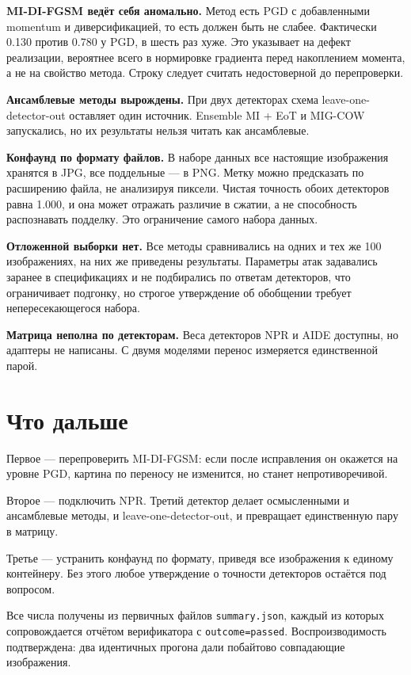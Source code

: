 \documentclass[11pt,a4paper]{article}
\begin{document}
\textbf{MI-DI-FGSM ведёт себя аномально.} Метод есть PGD с добавленными
momentum и диверсификацией, то есть должен быть не слабее. Фактически 0.130
против 0.780 у PGD, в шесть раз хуже. Это указывает на дефект реализации,
вероятнее всего в нормировке градиента перед накоплением момента, а не на
свойство метода. Строку следует считать недостоверной до перепроверки.

\textbf{Ансамблевые методы вырождены.} При двух детекторах схема
leave-one-detector-out оставляет один источник. Ensemble MI + EoT и MIG-COW
запускались, но их результаты нельзя читать как ансамблевые.

\textbf{Конфаунд по формату файлов.} В наборе данных все настоящие изображения
хранятся в JPG, все поддельные — в PNG. Метку можно предсказать по расширению
файла, не анализируя пиксели. Чистая точность обоих детекторов равна 1.000, и
она может отражать различие в сжатии, а не способность распознавать подделку.
Это ограничение самого набора данных.

\textbf{Отложенной выборки нет.} Все методы сравнивались на одних и тех же 100
изображениях, на них же приведены результаты. Параметры атак задавались заранее
в спецификациях и не подбирались по ответам детекторов, что ограничивает
подгонку, но строгое утверждение об обобщении требует непересекающегося набора.

\textbf{Матрица неполна по детекторам.} Веса детекторов NPR и AIDE доступны, но
адаптеры не написаны. С двумя моделями перенос измеряется единственной парой.

\section{Что дальше}

Первое — перепроверить MI-DI-FGSM: если после исправления он окажется на уровне
PGD, картина по переносу не изменится, но станет непротиворечивой.

Второе — подключить NPR. Третий детектор делает осмысленными и ансамблевые
методы, и leave-one-detector-out, и превращает единственную пару в матрицу.

Третье — устранить конфаунд по формату, приведя все изображения к единому
контейнеру. Без этого любое утверждение о точности детекторов остаётся под
вопросом.

\vfill
\footnotesize
Все числа получены из первичных файлов \texttt{summary.json}, каждый из которых
сопровождается отчётом верификатора с \texttt{outcome=passed}. Воспроизводимость
подтверждена: два идентичных прогона дали побайтово совпадающие изображения.
\end{document}
